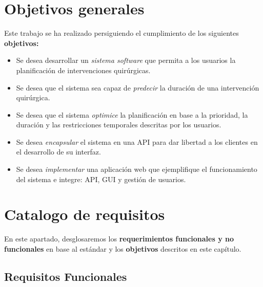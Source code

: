 \section{Objetivos generales}

Este trabajo se ha realizado persiguiendo el cumplimiento de los siguientes \textbf{objetivos:}

\begin{itemize}
    \item Se desea desarrollar un \textit{sistema software} que permita a los usuarios la planificación de intervenciones quirúrgicas.
    \item Se desea que el sistema sea capaz de \textit{predecir} la duración de una intervención quirúrgica.
    \item Se desea que el sistema \textit{optimice} la planificación en base a la prioridad, la duración y las restricciones temporales descritas por los usuarios.
    \item Se desea \textit{encapsular} el sistema en una API para dar libertad a los clientes en el desarrollo de su interfaz.
    \item Se desea \textit{implementar} una aplicación web que ejemplifique el funcionamiento del sistema e integre: API, GUI y gestión de usuarios.
\end{itemize}


\section{Catalogo de requisitos}

En este apartado, desglosaremos los \textbf{requerimientos funcionales y no funcionales} en base al estándar \cite{1998IEEESpecifications} y los \textbf{objetivos} descritos en este capítulo.

\subsection{Requisitos Funcionales}

